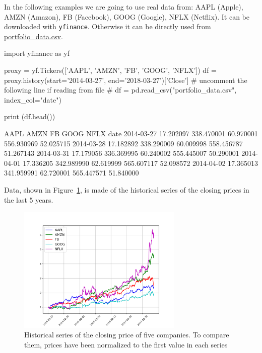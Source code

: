 In the following examples we are going to use real data
from:  AAPL (Apple), AMZN (Amazon), FB (Facebook), GOOG (Google), NFLX (Netflix). It can be downloaded with \texttt{yfinance}. Otherwise it can be directly used from \href{https://raw.githubusercontent.com/matteosan1/finance_course/develop/libro/input_files/portfolio_data.csv}{portfolio\_data.csv}.

\begin{ipython}
import yfinance as yf

proxy = yf.Tickers(['AAPL', 'AMZN', 'FB', 'GOOG', 'NFLX'])
df = proxy.history(start='2014-03-27', end='2018-03-27')['Close']
# uncomment the following line if reading from file
# df = pd.read_csv("portfolio_data.csv", index_col="date")

print (df.head())
\end{ipython}
\begin{ioutput}
                AAPL       AMZN        FB       GOOG      NFLX
date
2014-03-27 17.202097 338.470001 60.970001 556.930969 52.025715
2014-03-28 17.182892 338.290009	60.009998 558.456787 51.267143
2014-03-31 17.179056 336.369995	60.240002 555.445007 50.290001
2014-04-01 17.336205 342.989990	62.619999 565.607117 52.098572
2014-04-02 17.365013 341.959991	62.720001 565.447571 51.840000
\end{ioutput}
 
Data, shown in Figure~\ref{fig:stocks}, is made of the historical series of the closing prices in the last 5 years. 

\begin{figure}[htbp]
\centering
\includegraphics[width=0.7\textwidth]{figures/portfolio_sample}
\caption{Historical series of the closing price of five companies. To compare them, prices have been normalized to the first value in each series}
\label{fig:stocks}
\end{figure}

